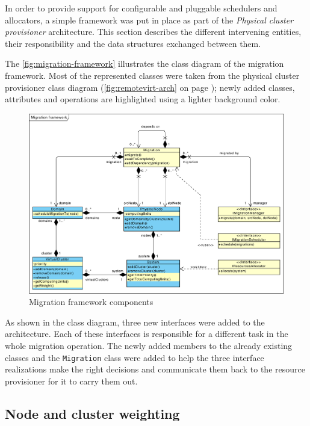 In order to provide support for configurable and pluggable schedulers and allocators, a simple framework was put in place as part of the \emph{Physical cluster provisioner} architecture. This section describes the different intervening entities, their responsibility and the data structures exchanged between them.

The \autoref{fig:migration-framework} illustrates the class diagram of the migration framework. Most of the represented classes were taken from the physical cluster provisioner class diagram (\autoref{fig:remotevirt-arch} on page \pageref{fig:remotevirt-arch}); newly added classes, attributes and operations are highlighted using a lighter background color.

\begin{figure}
	\centering
	\includegraphics[width=1\textwidth]{figures/migration-framework}
	\caption{Migration framework components}
	\label{fig:migration-framework}
\end{figure}

As shown in the class diagram, three new interfaces were added to the architecture. Each of these interfaces is responsible for a different task in the whole migration operation. The newly added members to the already existing classes and the \texttt{Migration} class were added to help the three interface realizations make the right decisions and communicate them back to the resource provisioner for it to carry them out.


\subsection{Node and cluster weighting}

